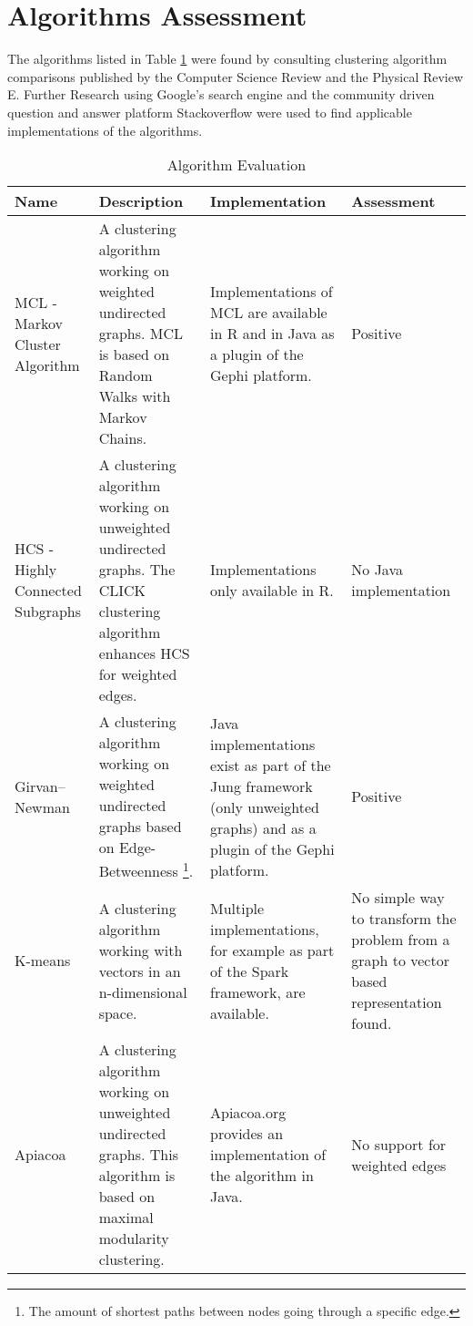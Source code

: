 \section{Algorithms Assessment}

The algorithms listed in Table \ref{tab:algorithmEvaluation} were found by consulting clustering algorithm comparisons published by the Computer Science Review\cite{schaeffer2007graph} and the Physical Review E\cite{lancichinetti2009community}. Further Research using Google's search engine and the community driven question and answer platform Stackoverflow\cite{stackoverflowGraphClustering} were used to find applicable implementations of the algorithms. 

\begin{table}[H]
	\centering
	\caption{Algorithm Evaluation}
	\label{tab:algorithmEvaluation}
	\begin{tabular}{|p{60pt}|p{140pt}|p{130pt}|p{70pt}|}
		\hline	
		\textbf{Name} & \textbf{Description} & \textbf{Implementation} & \textbf{Assessment} \\ 
		\hline
		MCL - Markov Cluster Algorithm\cite{markovCluster} & A clustering algorithm working on weighted undirected graphs. MCL is based on Random Walks with Markov Chains. & Implementations of MCL are available in R and in Java as a plugin of the Gephi\cite{gephi} platform. & Positive \\
		\hline
		HCS - Highly Connected Subgraphs\cite{hcs} & A clustering algorithm working on unweighted undirected graphs. The CLICK clustering algorithm enhances HCS for weighted edges. & Implementations only available in R. & No Java implementation  \\
		\hline
		Girvan–\newline Newman\cite{girvan} & A clustering algorithm working on weighted undirected graphs based on Edge-Betweenness \footnote{The amount of shortest paths between nodes going through a specific edge.}. & Java implementations exist as part of the Jung\cite{jung} framework (only unweighted graphs) and as a plugin of the Gephi\cite{gephi} platform. & Positive \\
		\hline	
		K-means\cite{kmeans} & A clustering algorithm working with vectors in an n-dimensional space. & Multiple implementations, for example as part of the Spark\cite{spark} framework, are available. & No simple way to transform the problem from a graph to vector based representation found. \\
		\hline
		Apiacoa\cite{apiacoa} & A clustering algorithm working on unweighted undirected graphs. This algorithm is based on maximal modularity clustering. & Apiacoa.org provides an implementation of the algorithm in Java. & No support for weighted edges\\

\end{tabular}
\end{table}
